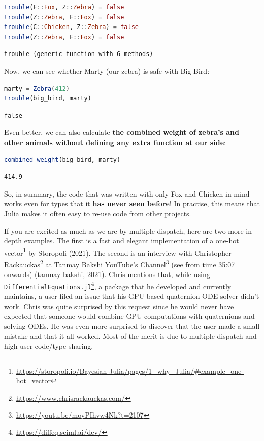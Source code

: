 \documentclass[
  notoc %
]{tufte-book}
\DeclareRobustCommand{\href}[2]{#2\footnote{\url{#1}}}
\newcommand{\passthrough}[1]{#1}
\begin{document}
\begin{lstlisting}[language=Julia]
trouble(F::Fox, Z::Zebra) = false
trouble(Z::Zebra, F::Fox) = false
trouble(C::Chicken, Z::Zebra) = false
trouble(Z::Zebra, F::Fox) = false
\end{lstlisting}

\begin{lstlisting}[language=Output]
trouble (generic function with 6 methods)
\end{lstlisting}

Now, we can see whether Marty (our zebra) is safe with Big Bird:

\begin{lstlisting}[language=Julia]
marty = Zebra(412)
trouble(big_bird, marty)
\end{lstlisting}

\begin{lstlisting}[language=Output]
false
\end{lstlisting}

Even better, we can also calculate \textbf{the combined weight of
zebra's and other animals without defining any extra function at our
side}:

\begin{lstlisting}[language=Julia]
combined_weight(big_bird, marty)
\end{lstlisting}

\begin{lstlisting}[language=Output]
414.9
\end{lstlisting}

So, in summary, the code that was written with only Fox and Chicken in
mind works even for types that it \textbf{has never seen before}! In
practise, this means that Julia makes it often easy to re-use code from
other projects.

If you are excited as much as we are by multiple dispatch, here are two
more in-depth examples. The first is a
\href{https://storopoli.io/Bayesian-Julia/pages/1_why_Julia/\#example_one-hot_vector}{fast
and elegant implementation of a one-hot vector} by
\protect\hyperlink{ref-storopoli2021bayesianjulia}{Storopoli}
(\protect\hyperlink{ref-storopoli2021bayesianjulia}{2021}). The second
is an interview with \href{https://www.chrisrackauckas.com/}{Christopher
Rackauckas} at \href{https://youtu.be/moyPIhvw4Nk?t=2107}{Tanmay Bakshi
YouTube's Channel} (see from time 35:07 onwards)
(\protect\hyperlink{ref-tanmaybakshiBakingKnowledgeMachine2021}{tanmay
bakshi, 2021}). Chris mentions that, while using
\href{https://diffeq.sciml.ai/dev/}{\passthrough{\lstinline!DifferentialEquations.jl!}},
a package that he developed and currently maintains, a user filed an
issue that his GPU-based quaternion ODE solver didn't work. Chris was
quite surprised by this request since he would never have expected that
someone would combine GPU computations with quaternions and solving
ODEs. He was even more surprised to discover that the user made a small
mistake and that it all worked. Most of the merit is due to multiple
dispatch and high user code/type sharing.
\end{document}

